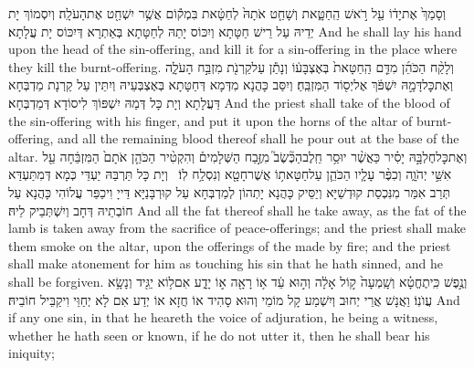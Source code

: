 {וְסָמַךְ֙ אֶת\maqqaf יָד֔וֹ עַ֖ל רֹ֣אשׁ הַֽחַטָּ֑את וְשָׁחַ֤ט אֹתָהּ֙ לְחַטָּ֔את בִּמְק֕וֹם אֲשֶׁ֥ר יִשְׁחַ֖ט אֶת\maqqaf הָעֹלָֽה׃}
{וְיִסְמוֹךְ יָת יְדֵיהּ עַל רֵישׁ חַטָּתָא וְיִכּוֹס יָתַהּ לְחַטָּתָא בְּאַתְרָא דְּיִכּוֹס יָת עֲלָתָא׃}
{And he shall lay his hand upon the head of the sin-offering, and kill it for a sin-offering in the place where they kill the burnt-offering.}{}
{וְלָקַ֨ח הַכֹּהֵ֜ן מִדַּ֤ם הַֽחַטָּאת֙ בְּאֶצְבָּע֔וֹ וְנָתַ֕ן עַל\maqqaf קַרְנֹ֖ת מִזְבַּ֣ח הָעֹלָ֑ה וְאֶת\maqqaf כׇּל\maqqaf דָּמָ֣הּ יִשְׁפֹּ֔ךְ אֶל\maqqaf יְס֖וֹד הַמִּזְבֵּֽחַ׃}
{וְיִסַּב כָּהֲנָא מִדְּמָא דְּחַטָּתָא בְּאֶצְבְּעֵיהּ וְיִתֵּין עַל קַרְנָת מַדְבְּחָא דַּעֲלָתָא וְיָת כָּל דְּמַהּ יִשְׁפּוֹךְ לִיסוֹדָא דְּמַדְבְּחָא׃}
{And the priest shall take of the blood of the sin-offering with his finger, and put it upon the horns of the altar of burnt-offering, and all the remaining blood thereof shall he pour out at the base of the altar.}{}
{וְאֶת\maqqaf כׇּל\maqqaf חֶלְבָּ֣הּ יָסִ֗יר כַּאֲשֶׁ֨ר יוּסַ֥ר חֵֽלֶב\maqqaf הַכֶּ֘שֶׂב֮ מִזֶּ֣בַח הַשְּׁלָמִים֒ וְהִקְטִ֨יר הַכֹּהֵ֤ן אֹתָם֙ הַמִּזְבֵּ֔חָה עַ֖ל אִשֵּׁ֣י יְהֹוָ֑ה וְכִפֶּ֨ר עָלָ֧יו הַכֹּהֵ֛ן עַל\maqqaf חַטָּאת֥וֹ אֲשֶׁר\maqqaf חָטָ֖א וְנִסְלַ֥ח לֽוֹ׃ \petucha }
{וְיָת כָּל תַּרְבַּהּ יַעְדֵּי כְּמָא דְּמִתַּעְדַּא תְּרַב אִמַּר מִנִּכְסַת קוּדְשַׁיָּא וְיַסֵּיק כָּהֲנָא יָתְהוֹן לְמַדְבְּחָא עַל קוּרְבָּנַיָּא דַּייָ וִיכַפַּר עֲלוֹהִי כָּהֲנָא עַל חוֹבְתֵיהּ דְּחָב וְיִשְׁתְּבֵיק לֵיהּ׃}
{And all the fat thereof shall he take away, as the fat of the lamb is taken away from the sacrifice of peace-offerings; and the priest shall make them smoke on the altar, upon the offerings of the \lord\space made by fire; and the priest shall make atonement for him as touching his sin that he hath sinned, and he shall be forgiven.}{}
\newperek
{}%
{וְנֶ֣פֶשׁ כִּֽי\maqqaf תֶחֱטָ֗א וְשָֽׁמְעָה֙ ק֣וֹל אָלָ֔ה וְה֣וּא עֵ֔ד א֥וֹ רָאָ֖ה א֣וֹ יָדָ֑ע אִם\maqqaf ל֥וֹא יַגִּ֖יד וְנָשָׂ֥א עֲוֺנֽוֹ׃}
{וַאֲנָשׁ אֲרֵי יְחוּב וְיִשְׁמַע קָל מוֹמֵי וְהוּא סָהִיד אוֹ חֲזָא אוֹ יְדַע אִם לָא יְחַוֵּי וִיקַבֵּיל חוֹבֵיהּ׃}
{And if any one sin, in that he heareth the voice of adjuration, he being a witness, whether he hath seen or known, if he do not utter it, then he shall bear his iniquity;}{}
